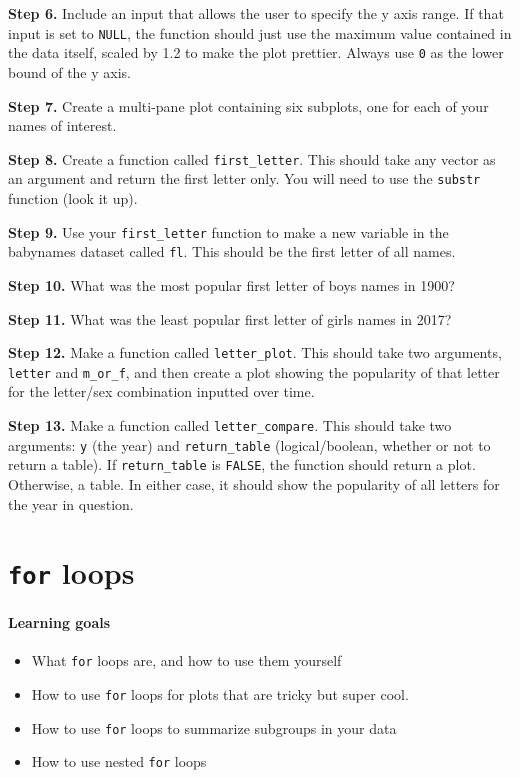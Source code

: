 \documentclass[
]{book}
\providecommand{\tightlist}{%
  \setlength{\itemsep}{0pt}\setlength{\parskip}{0pt}}
\begin{document}
\textbf{Step 6.} Include an input that allows the user to specify the y axis range. If that input is set to \texttt{NULL}, the function should just use the maximum value contained in the data itself, scaled by 1.2 to make the plot prettier. Always use \texttt{0} as the lower bound of the y axis.

\textbf{Step 7.} Create a multi-pane plot containing six subplots, one for each of your names of interest.

\textbf{Step 8.} Create a function called \texttt{first\_letter}. This should take any vector as an argument and return the first letter only. You will need to use the \texttt{substr} function (look it up).

\textbf{Step 9.} Use your \texttt{first\_letter} function to make a new variable in the babynames dataset called \texttt{fl}. This should be the first letter of all names.

\textbf{Step 10.} What was the most popular first letter of boys names in 1900?

\textbf{Step 11.} What was the least popular first letter of girls names in 2017?

\textbf{Step 12.} Make a function called \texttt{letter\_plot}. This should take two arguments, \texttt{letter} and \texttt{m\_or\_f}, and then create a plot showing the popularity of that letter for the letter/sex combination inputted over time.

\textbf{Step 13.} Make a function called \texttt{letter\_compare}. This should take two arguments: \texttt{y} (the year) and \texttt{return\_table} (logical/boolean, whether or not to return a table). If \texttt{return\_table} is \texttt{FALSE}, the function should return a plot. Otherwise, a table. In either case, it should show the popularity of all letters for the year in question.

\hypertarget{for-loops}{%
\chapter{\texorpdfstring{\texttt{for} loops}{for loops}}\label{for-loops}}

\hypertarget{learning-goals-16}{%
\subsubsection*{Learning goals}\label{learning-goals-16}}

\begin{itemize}
\tightlist
\item
  What \texttt{for} loops are, and how to use them yourself
\item
  How to use \texttt{for} loops for plots that are tricky but super cool.
\item
  How to use \texttt{for} loops to summarize subgroups in your data
\item
  How to use nested \texttt{for} loops
\end{itemize}
\end{document}
